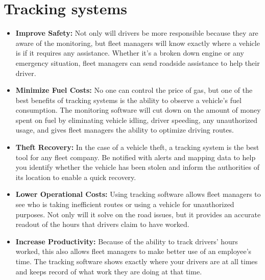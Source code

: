 \section{Tracking systems}
\begin{itemize}
	\item \textbf{Improve Safety:}
	Not only will drivers be more responsible because they are aware of the monitoring, but fleet managers will know exactly where a vehicle is if it requires any assistance. Whether it’s a broken down engine or any emergency situation, fleet managers can send roadside assistance to help their driver.
	
	
	\item \textbf{Minimize Fuel Costs:}
	No one can control the price of gas, but one of the best benefits of tracking systems is the ability to observe a vehicle’s fuel consumption. The monitoring software will cut down on the amount of money spent on fuel by eliminating vehicle idling, driver speeding, any unauthorized usage, and gives fleet managers the ability to optimize driving routes.
	
	
	\item \textbf{Theft Recovery:}
	In the case of a vehicle theft, a tracking system is the best tool for any fleet company. Be notified with alerts and mapping data to help you identify whether the vehicle has been stolen and inform the authorities of its location to enable a quick recovery.
	
	
	\item \textbf{Lower Operational Costs:}
	Using tracking software allows fleet managers to see who is taking inefficient routes or using a vehicle for unauthorized purposes. Not only will it solve on the road issues, but it provides an accurate readout of the hours that drivers claim to have worked.
	
	
	\item \textbf{Increase Productivity:}
	Because of the ability to track drivers’ hours worked, this also allows fleet managers to make better use of an employee’s time. The tracking software shows exactly where your drivers are at all times and keeps record of what work they are doing at that time.
\end{itemize}
